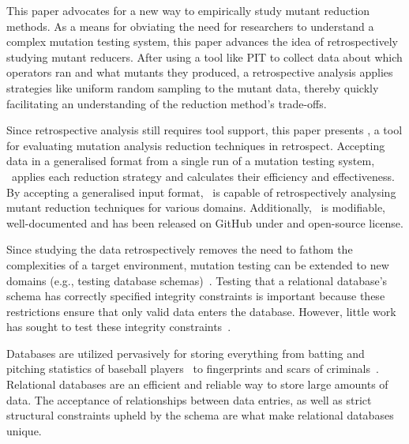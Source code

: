 
This paper advocates for a new way to empirically study mutant reduction methods. As a means for obviating the need for
researchers to understand a complex mutation testing system, this paper advances the idea of retrospectively studying
mutant reducers.  After using a tool like PIT to collect data about which operators ran and what mutants they produced,
a retrospective analysis applies strategies like uniform random sampling to the mutant data, thereby quickly
facilitating an understanding of the reduction method's trade-offs.


Since retrospective analysis still requires tool support, this paper presents \mr, a tool for evaluating mutation
analysis reduction techniques in retrospect. Accepting data in a generalised format from a single run of a mutation
testing system, \mr~applies each reduction strategy and calculates their efficiency and effectiveness.  By accepting a
generalised input format, \mr~is capable of retrospectively analysing mutant reduction techniques for various domains.
Additionally, \mr~is modifiable, well-documented and has been released on GitHub under and open-source license.


Since studying the data retrospectively removes the need to fathom the complexities of a target environment, mutation
testing can be extended to new domains (e.g., testing database schemas)~\cite{mcminn2016virtual,
mcminn2015effectiveness, wright2013efficient}.  Testing that a relational database's schema has correctly specified
integrity constraints is important because these restrictions ensure that only valid data enters the database. However,
little work has sought to test these integrity constraints~\cite{mcminn2016virtual}.

Databases are utilized pervasively for storing everything from batting and pitching statistics of baseball
players~\cite{lahmanbaseball} to fingerprints and scars of criminals~\cite{ngi}.  Relational databases are an efficient
and reliable way to store large amounts of data.  The acceptance of relationships between data entries, as well as
strict structural constraints upheld by the schema are what make relational databases unique.

